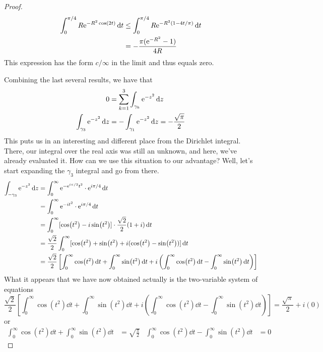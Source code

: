 \documentclass[../psets.tex]{subfiles}
\begin{document}
\begin{enumerate}[label={\textbf{\arabic*.}}]
\begin{proof}
        \begin{align*}
            \int_0^{\pi/4}R\e[-R^2\cos(2t)]\dd{t} &\leq \int_0^{\pi/4}R\e[-R^2(1-4t/\pi)]\dd{t}\\
            &= -\frac{\pi(\e[-R^2]-1)}{4R}
        \end{align*}
        This expression has the form $c/\infty$ in the limit and thus equals zero.\par
        Combining the last several results, we have that
        \begin{align*}
            0 &= \sum_{k=1}^3\int_{\gamma_k}\e[-z^2]\dd{z}\\
            \int_{\gamma_3}\e[-z^2]\dd{z} &= -\int_{\gamma_1}\e[-z^2]\dd{z} = -\frac{\sqrt{\pi}}{2}
        \end{align*}
        This puts us in an interesting and different place from the Dirichlet integral. There, our integral over the real axis was still an unknown, and here, we've already evaluated it. How can we use this situation to our advantage? Well, let's start expanding the $\gamma_3$ integral and go from there.
        \begin{align*}
            \int_{-\gamma_3}\e[-z^2]\dd{z} &= \int_0^\infty\e[{-\e[i\pi/2]t^2}]\cdot\e[i\pi/4]\dd{t}\\
            &= \int_0^\infty\e[-it^2]\cdot\e[i\pi/4]\dd{t}\\
            &= \int_0^\infty[\cos(t^2)-i\sin(t^2)]\cdot\frac{\sqrt{2}}{2}(1+i)\dd{t}\\
            &= \frac{\sqrt{2}}{2}\int_0^\infty[\cos(t^2)+\sin(t^2)+i(\cos(t^2)-\sin(t^2))]\dd{t}\\
            &= \frac{\sqrt{2}}{2}\left[ \int_0^\infty\cos(t^2)\dd{t}+\int_0^\infty\sin(t^2)\dd{t}+i\left( \int_0^\infty\cos(t^2)\dd{t}-\int_0^\infty\sin(t^2)\dd{t} \right) \right]
        \end{align*}
        What it appears that we have now obtained actually is the two-variable system of equations
        \begin{equation*}
            \frac{\sqrt{2}}{2}\left[ \int_0^\infty\cos(t^2)\dd{t}+\int_0^\infty\sin(t^2)\dd{t}+i\left( \int_0^\infty\cos(t^2)\dd{t}-\int_0^\infty\sin(t^2)\dd{t} \right) \right] = \frac{\sqrt{\pi}}{2}+i(0)
        \end{equation*}
        or
        \begin{align*}
            \int_0^\infty\cos(t^2)\dd{t}+\int_0^\infty\sin(t^2)\dd{t} &= \sqrt{\frac{\pi}{2}}&
            \int_0^\infty\cos(t^2)\dd{t}-\int_0^\infty\sin(t^2)\dd{t} &= 0

\end{align*}
\end{proof}
\end{enumerate}
\end{document}
